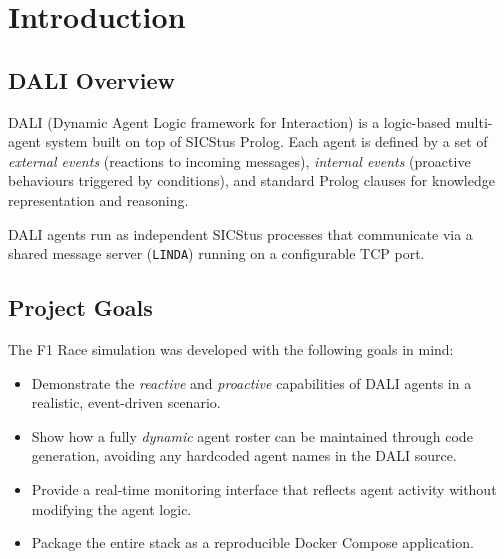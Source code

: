 \section{Introduction}

\subsection{DALI Overview}
DALI (Dynamic Agent Logic framework for Interaction) is a logic-based multi-agent system
built on top of SICStus Prolog. Each agent is defined by a set of \emph{external events}
(reactions to incoming messages), \emph{internal events} (proactive behaviours triggered by
conditions), and standard Prolog clauses for knowledge representation and reasoning.

DALI agents run as independent SICStus processes that communicate via a shared message
server (\texttt{LINDA}) running on a configurable TCP port.

\subsection{Project Goals}
The F1 Race simulation was developed with the following goals in mind:
\begin{itemize}[leftmargin=2em]
  \item Demonstrate the \emph{reactive} and \emph{proactive} capabilities of DALI agents in
        a realistic, event-driven scenario.
  \item Show how a fully \emph{dynamic} agent roster can be maintained through code
        generation, avoiding any hardcoded agent names in the DALI source.
  \item Provide a real-time monitoring interface that reflects agent activity without
        modifying the agent logic.
  \item Package the entire stack as a reproducible Docker Compose application.
\end{itemize}
